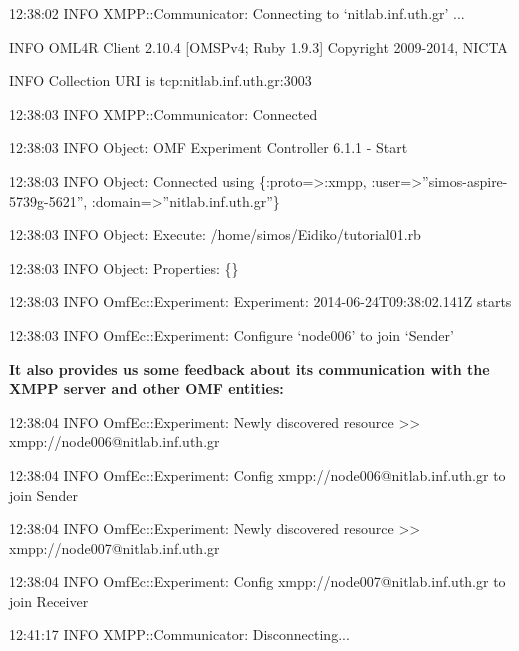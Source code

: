 \documentclass[letterpaper,10pt,english]{sphinxmanual}
\begin{document}
\begin{DUlineblock}{0em}
\item[] 12:38:02 INFO  XMPP::Communicator: Connecting to `nitlab.inf.uth.gr' ...
\item[] INFO  OML4R Client 2.10.4 {[}OMSPv4; Ruby 1.9.3{]} Copyright 2009-2014, NICTA
\item[] INFO  Collection URI is tcp:nitlab.inf.uth.gr:3003
\item[] 12:38:03 INFO  XMPP::Communicator: Connected
\item[] 12:38:03 INFO  Object: OMF Experiment Controller 6.1.1 - Start
\item[] 12:38:03 INFO  Object: Connected using \{:proto=\textgreater{}:xmpp, :user=\textgreater{}''simos-aspire-5739g-5621'', :domain=\textgreater{}''nitlab.inf.uth.gr''\}
\item[] 12:38:03 INFO  Object: Execute: /home/simos/Eidiko/tutorial01.rb
\item[] 12:38:03 INFO  Object: Properties: \{\}
\item[] 12:38:03 INFO  OmfEc::Experiment: Experiment: 2014-06-24T09:38:02.141Z starts
\item[] 12:38:03 INFO  OmfEc::Experiment: Configure `node006' to join `Sender'
\end{DUlineblock}

\begin{DUlineblock}{0em}
\item[] \textbf{It also provides us some feedback about its communication with the XMPP server and other OMF entities:}
\end{DUlineblock}

\begin{DUlineblock}{0em}
\item[] 12:38:04 INFO  OmfEc::Experiment: Newly discovered resource \textgreater{}\textgreater{} xmpp://node006@nitlab.inf.uth.gr
\item[] 12:38:04 INFO  OmfEc::Experiment: Config xmpp://node006@nitlab.inf.uth.gr to join Sender
\item[] 12:38:04 INFO  OmfEc::Experiment: Newly discovered resource \textgreater{}\textgreater{} xmpp://node007@nitlab.inf.uth.gr
\item[] 12:38:04 INFO  OmfEc::Experiment: Config xmpp://node007@nitlab.inf.uth.gr to join Receiver
\end{DUlineblock}

\begin{DUlineblock}{0em}
\item[] 12:41:17 INFO  XMPP::Communicator: Disconnecting...
\end{DUlineblock}
\end{document}
